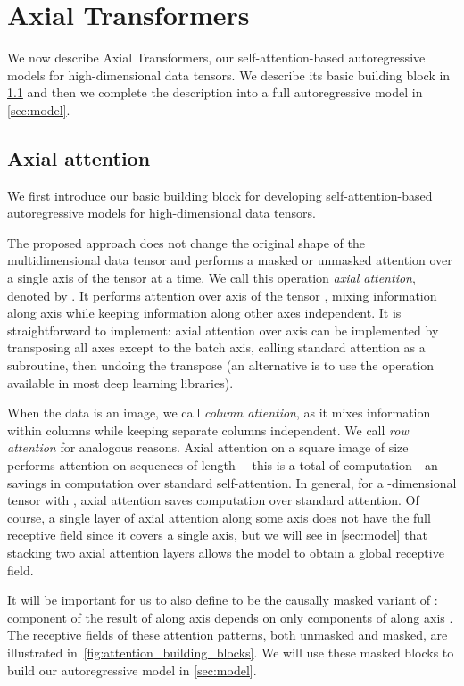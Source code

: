 \documentclass{article} \usepackage{iclr2020_conference,times}
\begin{document}
\section{Axial Transformers}

We now describe Axial Transformers, our self-attention-based autoregressive models for high-dimensional data tensors. We describe its basic building block in  \cref{sec:axialattention} and then we complete the description into a full autoregressive model in \cref{sec:model}.

\subsection{Axial attention}
\label{sec:axialattention}

We first introduce our basic building block for developing self-attention-based autoregressive models for high-dimensional data tensors.

The proposed approach does not change the original shape of the multidimensional data tensor and performs a masked or unmasked attention over a single axis of the tensor at a time.
We call this operation \emph{axial attention}, denoted by . It performs attention over axis  of the tensor , mixing information along axis  while keeping information along other axes independent. It is straightforward to implement: axial attention over axis  can be implemented by transposing all axes except  to the batch axis, calling standard attention as a subroutine, then undoing the transpose (an alternative is to use the  operation available in most deep learning libraries).

When the data is an image, we call  \emph{column attention}, as it mixes information within columns while keeping separate columns independent. We call  \emph{row attention} for analogous reasons. Axial attention on a square image of size  performs attention on  sequences of length ---this is a total of  computation---an  savings in computation over standard self-attention. In general, for a -dimensional tensor with , axial attention saves  computation over standard attention. Of course, a single layer of axial attention along some axis  does not have the full receptive field since it covers a single axis, but we will see in \cref{sec:model} that stacking two axial attention layers allows the model to obtain a global receptive field.


It will be important for us to also define  to be the causally masked variant of : component  of the result of  along axis  depends on only components  of  along axis . The receptive fields of these attention patterns, both unmasked and masked, are illustrated in~\cref{fig:attention_building_blocks}. We will use these masked blocks to build our autoregressive model in \cref{sec:model}.
\end{document}
